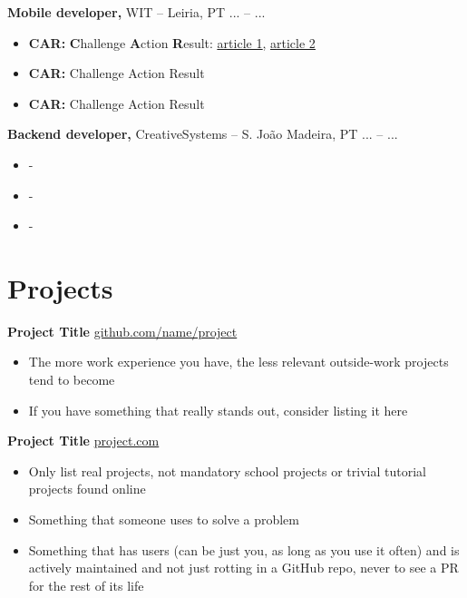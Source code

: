 \documentclass[11pt]{article}       %
\begin{document}
\textbf{Mobile developer,} {WIT} -- Leiria, PT \hfill ... -- ... \\
\vspace{-9pt}
\begin{itemize}
  \item \textbf{CAR:} \textbf{C}hallenge \textbf{A}ction \textbf{R}esult: \href{https://ca.indeed.com/career-advice/resumes-cover-letters/challenge-action-result-resume}{\underline{article 1}}, \href{https://www.topresume.com/career-advice/how-to-get-more-results-with-a-car-resume}{\underline{article 2}}
  \item \textbf{CAR:} Challenge Action Result
  \item \textbf{CAR:} Challenge Action Result
\end{itemize}

\textbf{Backend developer,} {CreativeSystems} -- S. João Madeira, PT \hfill ... -- ... \\
\vspace{-9pt}
\begin{itemize}
  \item -
  \item -
  \item -
\end{itemize}


\vspace{-18.5pt}

\section*{Projects}
\textbf{Project Title} \hfill \href{https://github.com/matiassingers/awesome-readme}{github.com/name/project} \\
\vspace{-9pt}
\begin{itemize}
  \item The more work experience you have, the less relevant outside-work projects tend to become
  \item If you have something that really stands out, consider listing it here
\end{itemize}

\textbf{Project Title} \hfill \href{https://mitcommlab.mit.edu/meche/commkit/portfolio/}{project.com} \\
\vspace{-9pt}
\begin{itemize}
  \item Only list real projects, not mandatory school projects or trivial tutorial projects found online 
  \item Something that someone uses to solve a problem
  \item Something that has users (can be just you, as long as you use it often) and is actively maintained and not just rotting in a GitHub repo, never to see a PR for the rest of its life
\end{itemize}
\end{document}
